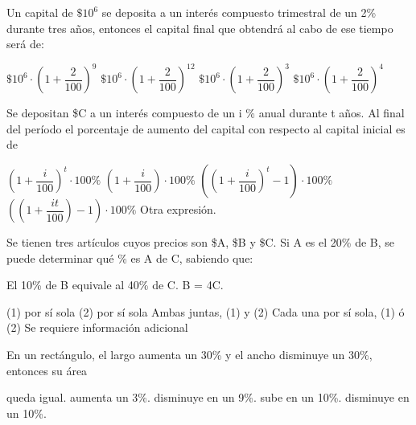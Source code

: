 \documentclass[pagina vacia]{srs}
\begin{document}
\begin{preguntas}[after-item-skip=2cm]
\pregunta Un capital de $\$10^6$ se deposita a un interés compuesto trimestral de un 2\% durante tres años, entonces el capital final que obtendrá al cabo de ese tiempo será de:
\begin{vertical}
\alternativa \( \$10^6 \cdot \left( 1 + \dfrac{2}{100} \right)^9 \)
\alternativa \( \$10^6 \cdot \left( 1 + \dfrac{2}{100} \right)^{12} \)
\alternativa \( \$10^6 \cdot \left( 1 + \dfrac{2}{100} \right)^3 \)
\alternativa \( \$10^6 \cdot \left( 1 + \dfrac{2}{100} \right)^4 \)
\end{vertical}

\pregunta Se depositan \$C a un interés compuesto de un i \% anual durante t años. Al final del período el porcentaje de aumento del capital con respecto al capital inicial es de
\begin{vertical}
\alternativa \( \left( 1 + \dfrac{i}{100} \right)^t \cdot 100\% \)
\alternativa \( \left( 1 + \dfrac{i}{100} \right) \cdot 100\% \)
\alternativa \( \left( \left( 1 + \dfrac{i}{100} \right)^t - 1 \right) \cdot 100\% \)
\alternativa \( \left( \left( 1 + \dfrac{it}{100} \right) - 1 \right) \cdot 100\% \)
\alternativa Otra expresión.
\end{vertical}

\pregunta Se tienen tres artículos cuyos precios son \$A, \$B y \$C. Si A es el 20\% de B, se puede determinar qué \% es A de C, sabiendo que:
\begin{verticaln}
\alternativa El 10\% de B equivale al 40\% de C.
\alternativa B = 4C.
\end{verticaln}
\begin{vertical}
\alternativa (1) por sí sola
\alternativa (2) por sí sola
\alternativa Ambas juntas, (1) y (2)
\alternativa Cada una por sí sola, (1) ó (2)
\alternativa Se requiere información adicional
\end{vertical}

\pregunta En un rectángulo, el largo aumenta un 30\% y el ancho disminuye un 30\%, entonces su área
\begin{vertical}
\alternativa queda igual.
\alternativa aumenta un 3\%.
\alternativa disminuye en un 9\%.
\alternativa sube en un 10\%.
\alternativa disminuye en un 10\%.
\end{vertical}


\end{preguntas}
\end{document}
